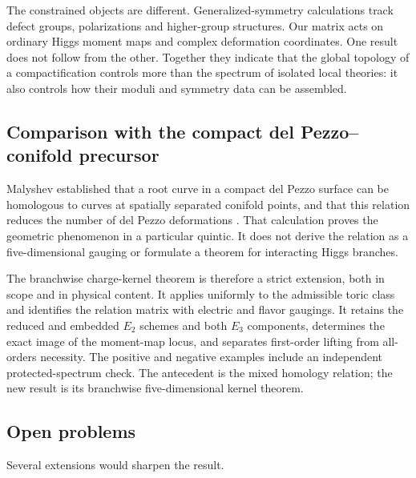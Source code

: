 The constrained objects are different. Generalized-symmetry calculations
track defect groups, polarizations and higher-group structures. Our matrix
acts on ordinary Higgs moment maps and complex deformation coordinates. One
result does not follow from the other. Together they indicate that the global
topology of a compactification controls more than the spectrum of isolated
local theories: it also controls how their moduli and symmetry data can be
assembled.

\subsection{Comparison with the compact del Pezzo--conifold precursor}
\label{subsec:malyshev-comparison}

Malyshev established that a root curve in a compact del Pezzo surface can be
homologous to curves at spatially separated conifold points, and that this
relation reduces the number of del Pezzo deformations
\cite{Malyshev:2007zz}. That calculation proves the geometric phenomenon in a
particular quintic. It does not derive the relation as a five-dimensional
gauging or formulate a theorem for interacting Higgs branches.

The branchwise charge-kernel theorem is therefore a strict extension, both in
scope and in physical content. It applies uniformly to the admissible toric
class and identifies the relation matrix with electric and flavor gaugings.
It retains the reduced and embedded $E_2$ schemes and both $E_3$ components,
determines the exact image of the moment-map locus, and separates first-order
lifting from all-orders necessity. The positive and negative examples include
an independent protected-spectrum check. The antecedent is the mixed homology
relation; the new result is its branchwise five-dimensional kernel theorem.

\subsection{Open problems}
\label{subsec:open-problems}

Several extensions would sharpen the result.

